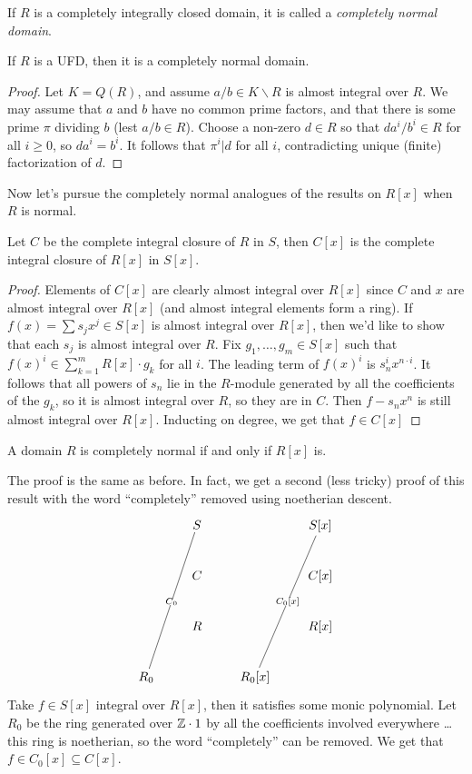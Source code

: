  If $R$ is a completely integrally closed domain, it is called a \emph{completely normal
 domain}.
 \begin{proposition}
   If $R$ is a UFD, then it is a completely normal domain.
 \end{proposition}
 \begin{proof}
   Let $K=Q(R)$, and assume $a/b\in K\smallsetminus R$ is almost integral over $R$. We
   may assume that $a$ and $b$ have no common prime factors, and that there is some prime
   $\pi$ dividing $b$ (lest $a/b\in R$). Choose a non-zero $d\in R$ so that $da^i/b^i\in
   R$ for all $i\ge 0$, so $d a^i=b^i$. It follows that $\pi^i|d$ for all $i$,
   contradicting unique (finite) factorization of $d$.
 \end{proof}
 Now let's pursue the completely normal analogues of the results on $R[x]$ when $R$ is
 normal.
 \begin{proposition}
   Let $C$ be the complete integral closure of $R$ in $S$, then $C[x]$ is the complete
   integral closure of $R[x]$ in $S[x]$.
 \end{proposition}
 \begin{proof}
   Elements of $C[x]$ are clearly almost integral over $R[x]$ since $C$ and $x$ are
   almost integral over $R[x]$ (and almost integral elements form a ring). If $f(x)=\sum
   s_j x^j\in S[x]$ is almost integral over $R[x]$, then we'd like to show that each
   $s_j$ is almost integral over $R$. Fix $g_1,\dots, g_m\in S[x]$ such that $f(x)^i\in
   \sum_{k=1}^m R[x]\cdot g_k$ for all $i$. The leading term of $f(x)^i$ is $s_n^i
   x^{n\cdot i}$. It follows that all powers of $s_n$ lie in the $R$-module generated by
   all the coefficients of the $g_k$, so it is almost integral over $R$, so they are in
   $C$. Then $f-s_nx^n$ is still almost integral over $R[x]$. Inducting on degree, we get
   that $f\in C[x]$
 \end{proof}
 \begin{corollary}
   A domain $R$ is completely normal if and only if $R[x]$ is.
 \end{corollary}
 The proof is the same as before. In fact, we get a second (less tricky) proof of this
 result with the word ``completely'' removed using noetherian descent.
 \[\xymatrix{
 & S & & S[x]\\
 & C & & C[x]\\
 & R & & R[x]\\
 R_0 \ar@{-}[ruuu]|{C_0} & & R_0[x] \ar@{-}[ruuu]|{C_0[x]}
 }\]
 Take $f\in S[x]$ integral over $R[x]$, then it satisfies some monic polynomial. Let
 $R_0$ be the ring generated over $\mathbb{Z}\cdot 1$ by all the coefficients involved
 everywhere \dots this ring is noetherian, so the word ``completely'' can be removed. We
 get that $f\in C_0[x]\subseteq C[x]$.

